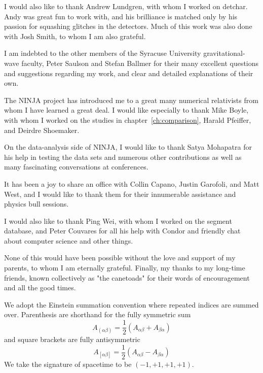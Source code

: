 \documentclass[12pt,notitlepage]{report}
\begin{document}
I would also like to thank Andrew Lundgren, with whom I worked on
detchar.  Andy was great fun to work with, and his brilliance is
matched only by his passion for squashing glitches in the detectors.
Much of this work was also done with Josh Smith, to whom I am also
grateful.

I am indebted to the other members of the Syracuse University
gravitational-wave faculty, Peter Saulson and Stefan Ballmer for their
many excellent questions and suggestions regarding my work, and clear
and detailed explanations of their own.

The NINJA project has introduced me to a great many numerical
relativists from whom I have learned a great deal.  I would like
especially to thank Mike Boyle, with whom I worked on the studies in
chapter~\ref{ch:comparison}, Harald Pfeiffer, and Deirdre Shoemaker.

On the data-analysis side of NINJA, I would like to thank Satya
Mohapatra for his help in testing the data sets and numerous other
contributions as well as many fascinating conversations at
conferences.

It has been a joy to share an office with Collin Capano, Justin
Garofoli, and Matt West, and I would like to thank them for their
innumerable assistance and physics bull sessions.

I would also like to thank Ping Wei, with whom I worked on the segment
database, and Peter Couvares for all his help with Condor and friendly
chat about computer science and other things.

None of this would have been possible without the love and support of
my parents, to whom I am eternally grateful.  Finally, my thanks to my
long-time friends, known collectively as "the canetoads" for their
words of encouragement and all the good times.



We adopt the Einstein summation convention where repeated indices are
summed over.  Parenthesis are shorthand for the fully symmetric sum
%
\begin{equation*}
A_{(\alpha\beta)}
= \frac{1}{2} \left(A_{\alpha\beta} 
+ A_{\beta\alpha} \right)
\end{equation*}
%
and square brackets are fully antisymmetric
%
\begin{equation*}
A_{[\alpha\beta]}
= \frac{1}{2} \left(A_{\alpha\beta} 
- A_{\beta\alpha} \right)
\end{equation*}
%
We take the signature of spacetime to be $(-1,+1,+1,+1)$.
\end{document}
